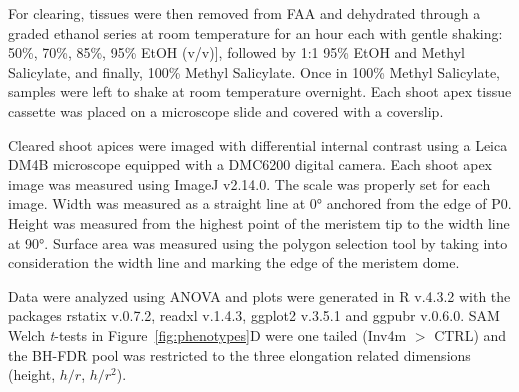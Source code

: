 \documentclass[9pt,twocolumn,twoside]{rilabRxiv}
\begin{document}
For clearing, tissues were then removed from FAA and dehydrated through a graded ethanol series at room temperature for an hour each with gentle shaking: 50\%, 70\%, 85\%, 95\% EtOH (v/v)], followed by 1:1 95\% EtOH and Methyl Salicylate, and finally, 100\% Methyl Salicylate.
Once in 100\% Methyl Salicylate, samples were left to shake at room temperature overnight.
Each shoot apex tissue cassette was placed on a microscope slide and covered with a coverslip.

Cleared shoot apices were imaged with differential internal contrast using a Leica DM4B microscope equipped with a DMC6200 digital camera.
Each shoot apex image was measured using ImageJ v2.14.0.
The scale was properly set for each image.
Width was measured as a straight line at 0° anchored from the edge of P0.
Height was measured from the highest point of the meristem tip to the width line at 90°.
Surface area was measured using the polygon selection tool by taking into consideration the width line and marking the edge of the meristem dome.

Data were analyzed using ANOVA and plots were generated in R v.4.3.2 with the packages rstatix v.0.7.2, readxl v.1.4.3, ggplot2 v.3.5.1 and ggpubr v.0.6.0.
SAM Welch \textit{t}-tests in Figure~\ref{fig:phenotypes}D were one tailed (Inv4m $>$ CTRL) and the BH-FDR pool was restricted to the three elongation related dimensions (height, $h/r$, $h/r^2$).
\end{document}
